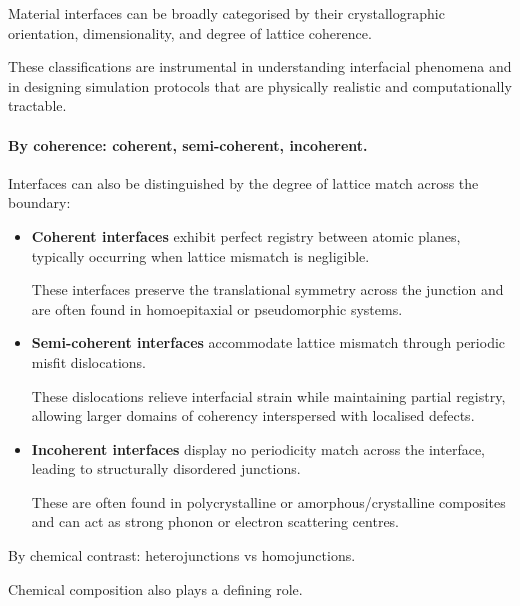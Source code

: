 \label{para:interface_classification} %

Material interfaces can be broadly categorised by their crystallographic orientation, dimensionality, and degree of
lattice coherence.

These classifications are instrumental in understanding interfacial phenomena and in designing simulation protocols that
are physically realistic and computationally tractable.

\label{para:interface_coherence} %

\paragraph{By coherence: coherent, semi-coherent, incoherent.} Interfaces can also be distinguished by the degree of
lattice match across the boundary:

\begin{itemize}

    \item \textbf{Coherent interfaces} exhibit perfect registry between atomic planes, typically occurring when lattice
    mismatch is negligible.

    These interfaces preserve the translational symmetry across the junction and are often found in homoepitaxial or
    pseudomorphic systems.

    \item \textbf{Semi-coherent interfaces} accommodate lattice mismatch through periodic misfit dislocations.

    These dislocations relieve interfacial strain while maintaining partial registry, allowing larger domains of
    coherency interspersed with localised defects.

    \item \textbf{Incoherent interfaces} display no periodicity match across the interface, leading to structurally
    disordered junctions.

    These are often found in polycrystalline or amorphous/crystalline composites and can act as strong phonon or
    electron scattering centres.

\end{itemize}

\label{para:chemical_contrast_hetero_homo} %

By chemical contrast: heterojunctions vs homojunctions.

Chemical composition also plays a defining role.

